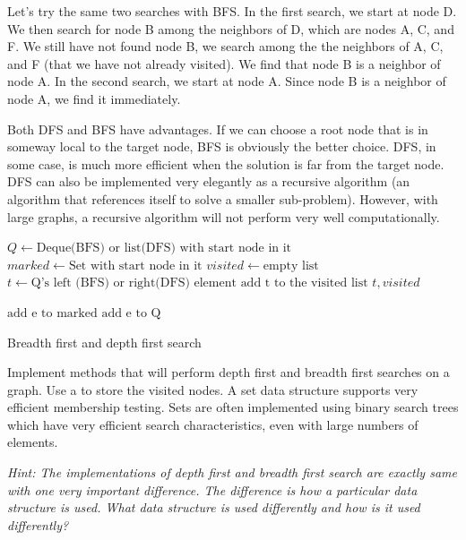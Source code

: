 Let's try the same two searches with BFS.
In the first search, we start at node D.
We then search for node B among the neighbors of D, which are nodes A, C, and F.
We still have not found node B, we search among the the neighbors of A, C, and F (that we have not already visited).
We find that node B is a neighbor of node A.
In the second search, we start at node A.  Since node B is a neighbor of node A, we find it immediately.

Both DFS and BFS have advantages.  
If we can choose a root node that is in someway local to the target node, BFS is obviously the better choice.
DFS, in some case, is much more efficient when the solution is far from the target node.
DFS can also be implemented very elegantly as a recursive algorithm (an algorithm that references itself to solve a smaller sub-problem).
However, with large graphs, a recursive algorithm will not perform very well computationally.

\begin{algorithm}
\begin{algorithmic}[1]
	\State $Q \gets \text{Deque(BFS) or list(DFS) with start node in it}$	
	\State $marked \gets \text{Set with start node in it}$
	\State $visited \gets \text{empty list}$
					
		\State $t \gets \text{Q's left (BFS) or right(DFS) element}$		
		\State $\text{add t to the visited list}$
				
			\State {} $t,visited$
		
		\Else
					\State $\text{add e to marked}$
					\State $\text{add e to Q}$
				\EndIf
			\EndFor
		\EndIf
	\EndWhile
\EndProcedure
\end{algorithmic}
\caption{Breadth first and depth first search}
\label{alg:BFSDFS}
\end{algorithm}

\begin{problem}
Implement methods that will perform depth first and breadth first searches on a graph.
Use a  to store the visited nodes.  A set data structure supports very efficient membership testing.
Sets are often implemented using binary search trees which have very efficient search characteristics, even with large numbers of elements.

\textit{Hint: The implementations of depth first and breadth first search are exactly same with one very important difference.
The difference is how a particular data structure is used.  What data structure is used differently and how is it used differently?}
\end{problem}

